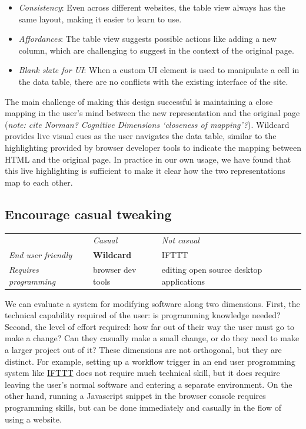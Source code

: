 \documentclass[english,submission]{programming}
\providecommand{\tightlist}{%
  \setlength{\itemsep}{0pt}\setlength{\parskip}{0pt}}
\begin{document}
\begin{itemize}
\tightlist
\item
  \emph{Consistency}: Even across different websites, the table view
  always has the same layout, making it easier to learn to use.
\item
  \emph{Affordances}: The table view suggests possible actions like
  adding a new column, which are challenging to suggest in the context
  of the original page.
\item
  \emph{Blank slate for UI}: When a custom UI element is used to
  manipulate a cell in the data table, there are no conflicts with the
  existing interface of the site.
\end{itemize}

The main challenge of making this design successful is maintaining a
close mapping in the user's mind between the new representation and the
original page (\emph{note: cite Norman? Cognitive Dimensions `closeness
of mapping'?}). Wildcard provides live visual cues as the user navigates
the data table, similar to the highlighting provided by browser
developer tools to indicate the mapping between HTML and the original
page. In practice in our own usage, we have found that this live
highlighting is sufficient to make it clear how the two representations
map to each other.

\hypertarget{encourage-casual-tweaking}{%
\subsection{Encourage casual tweaking}\label{encourage-casual-tweaking}}

\begin{longtable}[]{@{}lll@{}}
\toprule
\endhead
& \emph{Casual} & \emph{Not casual}\tabularnewline
\emph{End user friendly} & \textbf{Wildcard} & IFTTT\tabularnewline
\emph{Requires programming} & browser dev tools & editing open source
desktop applications\tabularnewline
\bottomrule
\end{longtable}

We can evaluate a system for modifying software along two dimensions.
First, the technical capability required of the user: is programming
knowledge needed? Second, the level of effort required: how far out of
their way the user must go to make a change? Can they casually make a
small change, or do they need to make a larger project out of it? These
dimensions are not orthogonal, but they are distinct. For example,
setting up a workflow trigger in an end user programming system like
\href{https://ifttt.com/}{IFTTT} does not require much technical skill,
but it does require leaving the user's normal software and entering a
separate environment. On the other hand, running a Javascript snippet in
the browser console requires programming skills, but can be done
immediately and casually in the flow of using a website.
\end{document}
